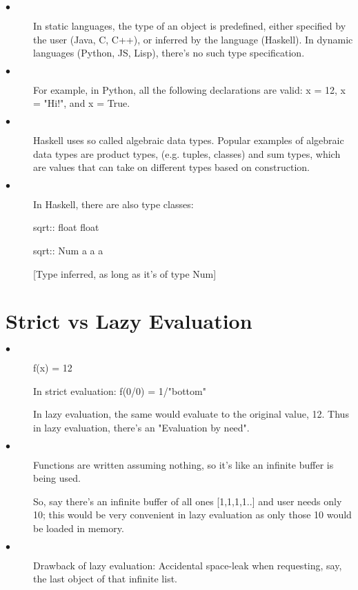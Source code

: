 \documentclass[twoside]{article}
\begin{document}
\begin{description}

  \item[$\bullet$] In static languages, the type of an object is predefined, either specified by the user (Java, C, C++), or inferred by the language (Haskell). In dynamic languages (Python, JS, Lisp), there's no such type specification.
  
  \item[$\bullet$] For example, in Python, all the following declarations are valid: x = 12, x = "Hi!", and x = True.
  
  \item[$\bullet$] Haskell uses so called algebraic data types. Popular examples of algebraic data types are product types, (e.g.  tuples, classes) and sum types, which are values that can take on different types based on construction.
  
  \item[$\bullet$] In Haskell, there are also type classes:
  
  sqrt:: float \rightarrow float
  
  sqrt:: Num a \rightarrow a \rightarrow a
   
   [Type inferred, as long as it's of type Num]
  
 
\end{description}

\section{Strict vs Lazy Evaluation}

\begin{description}
 \item[$\bullet$] f(x) = 12
 
 In strict evaluation: f(0/0) = 1/"bottom"
 
 In lazy evaluation, the same would evaluate to the original value, 12. Thus in lazy evaluation, there's an "Evaluation by need".
 
\item[$\bullet$] Functions are written assuming nothing, so it's like an infinite buffer is being used.

So, say there's an infinite buffer of all ones [1,1,1,1..] and user needs only 10; this would be very convenient in lazy evaluation as only those 10 would be loaded in memory.

\item[$\bullet$] Drawback of lazy evaluation: Accidental space-leak when requesting, say, the last object of that infinite list.

\end{description}
\end{document}
